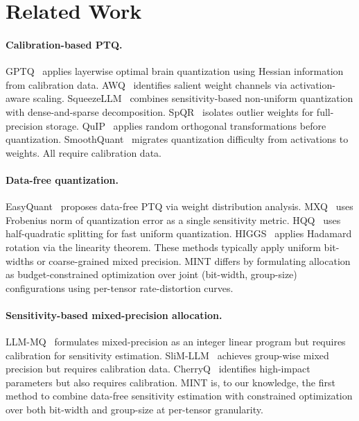 \documentclass{article}
\begin{document}
\section{Related Work}
\label{sec:related}

\paragraph{Calibration-based PTQ.}
GPTQ~\cite{frantar2023gptq} applies layerwise optimal brain quantization using Hessian information from calibration data. AWQ~\cite{lin2024awq} identifies salient weight channels via activation-aware scaling. SqueezeLLM~\cite{kim2024squeezellm} combines sensitivity-based non-uniform quantization with dense-and-sparse decomposition. SpQR~\cite{dettmers2024spqr} isolates outlier weights for full-precision storage. QuIP~\cite{chee2024quip} applies random orthogonal transformations before quantization. SmoothQuant~\cite{xiao2023smoothquant} migrates quantization difficulty from activations to weights. All require calibration data.

\paragraph{Data-free quantization.}
EasyQuant~\cite{tang2024easyquant} proposes data-free PTQ via weight distribution analysis. MXQ~\cite{zhang2025mxq} uses Frobenius norm of quantization error as a single sensitivity metric. HQQ~\cite{badri2024hqq} uses half-quadratic splitting for fast uniform quantization. HIGGS~\cite{badri2025higgs} applies Hadamard rotation via the linearity theorem. These methods typically apply uniform bit-widths or coarse-grained mixed precision. MINT differs by formulating allocation as budget-constrained optimization over joint (bit-width, group-size) configurations using per-tensor rate-distortion curves.

\paragraph{Sensitivity-based mixed-precision allocation.}
LLM-MQ~\cite{li2024llmmq} formulates mixed-precision as an integer linear program but requires calibration for sensitivity estimation. SliM-LLM~\cite{huang2025slimllm} achieves group-wise mixed precision but requires calibration data. CherryQ~\cite{shang2024cherryq} identifies high-impact parameters but also requires calibration. MINT is, to our knowledge, the first method to combine data-free sensitivity estimation with constrained optimization over both bit-width and group-size at per-tensor granularity.
\end{document}
